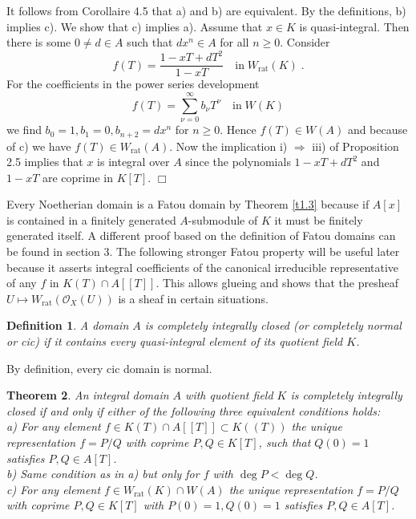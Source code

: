\documentclass[12pt,leqno]{article}
\newcommand{\rat}{\mathrm{rat}}
\newcommand{\Oh}{{\mathcal O}}
\newtheorem{theorem}{Theorem}[section]
\newtheorem{defn}[theorem]{Definition}
\newenvironment{proof}{\noindent {\bf Proof}}{\mbox{}\hspace*{\fill}$\Box$}
\begin{document}
\begin{proof}
It follows from \cite{CC} Corollaire 4.5 that a) and b) are equivalent. By the definitions, b) implies c). We show that c) implies a). Assume that $x \in K$ is quasi-integral. Then there is some $0 \neq d \in A$ such that $d x^n \in A$ for all $n \ge 0$. Consider
\[
f (T) = \frac{1 - xT + dT^2}{1 - xT} \quad \text{in} \; W_{\rat} (K) \; .
\]
For the coefficients in the power series development
\[
f (T) = \sum^{\infty}_{\nu = 0} b_{\nu} T^{\nu} \quad \text{in} \; W (K)
\]
we find $b_0 = 1 , b_1 = 0 , b_{n+2} = dx^n$ for $n \ge 0$. Hence $f (T) \in W(A)$ and because of c) we have $f (T) \in W_{\rat} (A)$. Now the implication i) $\Rightarrow$ iii) of \cite{CC} Proposition 2.5 implies that $x$ is integral over $A$ since the polynomials $1 - xT + dT^2$ and $1 - x T$ are coprime in $K [T]$. 
\end{proof}

Every Noetherian domain is a Fatou domain by Theorem \ref{t1.3} because if $A [x]$ is contained in a finitely generated $A$-submodule of $K$ it must be finitely generated itself. A different proof based on the definition of Fatou domains can be found in \cite{H} section 3. The following stronger Fatou property will be useful later because it asserts integral coefficients of the canonical irreducible representative of any $f$ in $K (T) \cap A [[T]]$. This allows glueing and shows that the presheaf $U \mapsto W_{\rat} (\Oh_X (U))$ is a sheaf in certain situations. 

\begin{defn}
\label{t1.4}
A domain $A$ is completely integrally closed (or completely normal or cic) if it contains every quasi-integral element of its quotient field $K$.
\end{defn}

By definition, every cic domain is normal.

\begin{theorem}
\label{t1.5}
An integral domain $A$ with quotient field $K$ is completely integrally closed if and only if either of the following three equivalent conditions holds:\\
a) For any element $f \in K (T) \cap A [[T]] \subset K ((T))$ the unique representation $f = P / Q$ with coprime $P , Q \in K [T]$, such that $Q (0) = 1$ satisfies $P , Q \in A [T]$.\\
b) Same condition as in a) but only for $f$ with $\deg P < \deg Q$.\\
c) For any element $f \in W_{\rat} (K) \cap W (A)$ the unique representation $f = P / Q$ with coprime $P , Q \in K [T]$ with $P (0) = 1 , Q (0) = 1$ satisfies $P , Q \in A [T]$. 
\end{theorem}
\end{document}
